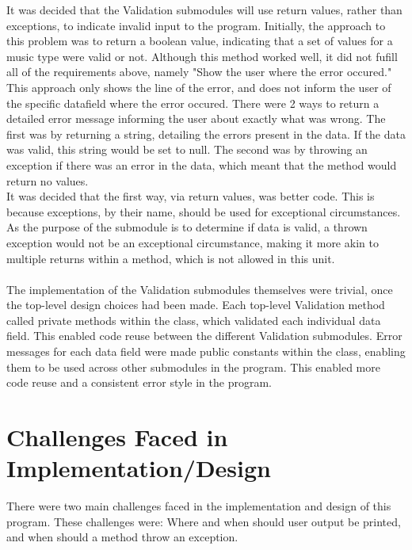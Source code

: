 \documentclass{article}
\begin{document}
    It was decided that the Validation submodules will use return values, rather than exceptions,
        to indicate invalid input to the program.
    Initially, the approach to this problem was to return a boolean value, indicating that a set of
        values for a music type were valid or not. Although this method worked well, it did not fufill
        all of the requirements above, namely "Show the user where the error occured." This approach only
        shows the line of the error, and does not inform the user of the specific datafield where the error
        occured.
    There were 2 ways to return a detailed error message informing the user about exactly what was wrong.
    The first was by returning a string, detailing the errors present in the data. If the data was valid,
        this string would be set to null.
    The second was by throwing an exception if there was an error in the data, which meant that the method would return no values.\\
    It was decided that the first way, via return values, was better code. This is because exceptions,
        by their name, should be used for exceptional circumstances. As the purpose of the submodule is to determine if data is valid,
        a thrown exception would not be an exceptional circumstance, making it more akin to multiple returns within a method, which is not allowed
        in this unit.
    \\\\
    The implementation of the Validation submodules themselves were trivial, once the top-level design
        choices had been made. Each top-level Validation method called private methods within the class,
        which validated each individual data field. This enabled code reuse between the different Validation submodules.
    Error messages for each data field were made public constants within the class, enabling them to be used across other
    	submodules in the program. This enabled more code reuse and a consistent error style in the program.
    \section{Challenges Faced in Implementation/Design}
	There were two main challenges faced in the implementation and design of this program. These challenges were: Where and when should user output be printed,
		and when should a method throw an exception.
\end{document}
